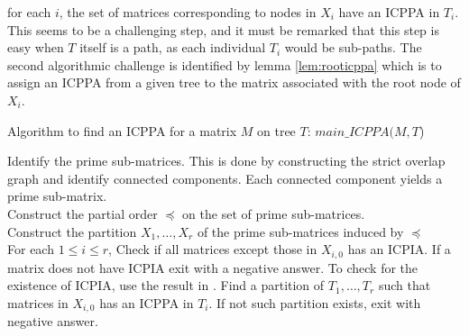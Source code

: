 \documentclass[MS]             %
              {iitmdiss_as}    %
\begin{document}
for each $i$, the set of matrices corresponding to nodes in $X_i$ have
an ICPPA in $T_i$.  This seems to be a challenging step, and it must
be remarked that this step is easy when $T$ itself is a path, as each
individual $T_i$ would be sub-paths.  The second algorithmic challenge
is identified by lemma \ref{lem:rooticppa} which is to assign an ICPPA
from a given tree to the matrix associated with the root node of
$X_i$.
\begin{algorithm}[h]
  \caption{Algorithm to find an ICPPA for a matrix $M$ on tree $T$:
    $main\_ICPPA(M, T$)}
  \label{al:icppa-main}
  \begin{algorithmic}
    \STATE Identify the prime sub-matrices. This is done by constructing the strict overlap graph and identify connected components.  Each connected component yields a prime sub-matrix.   \\
    \STATE Construct the partial order $\preccurlyeq$ on the set of prime sub-matrices.  \\
    \STATE Construct the partition $X_1,\ldots,X_r$ of the prime
    sub-matrices induced by $\preccurlyeq$ \\
    \STATE For each $1 \leq i \leq r$, Check if all matrices except
    those in $X_{i,0}$ has an ICPIA.  If a matrix does not have ICPIA
    exit with a negative answer.  To check for the existence of ICPIA,
    use the result in \cite{nsnrs09}.  \STATE Find a partition of
    $T_1, \ldots, T_r$ such that matrices in $X_{i,0}$ has an ICPPA in
    $T_i$.  If not such partition exists, exit with negative answer.
  \end{algorithmic}
\end{algorithm}
\end{document}
